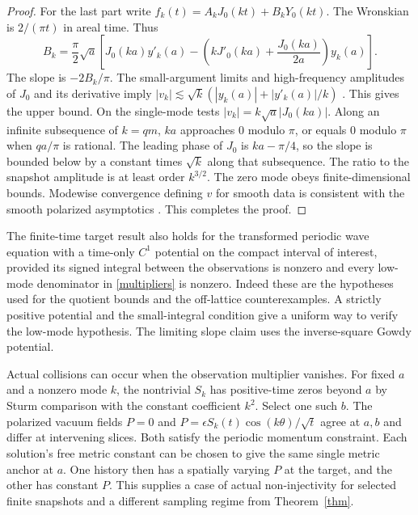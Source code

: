 \documentclass[11pt]{article}
\begin{document}
\begin{proof}
For the last part write
$f_k(t)=A_kJ_0(kt)+B_kY_0(kt)$.
The Wronskian is $2/(\pi t)$ in areal time. Thus
\[
 B_k=\frac{\pi}{2}\sqrt a\left[
 J_0(ka)y'_k(a)
 -\left(kJ'_0(ka)+\frac{J_0(ka)}{2a}\right)y_k(a)\right].
\]
The slope is $-2B_k/\pi$. The small-argument limits and high-frequency
amplitudes of $J_0$ and its derivative imply
$|v_k|\lesssim \sqrt k (|y_k(a)|+|y'_k(a)|/k)$
\cite[Sections 10.5, 10.7 and 10.17]{dlmf}. This gives the upper
bound. On the single-mode tests $|v_k|=k\sqrt a |J_0(ka)|$.
Along an infinite subsequence of $k=qm$, $ka$ approaches $0$ modulo
$\pi$, or equals $0$ modulo $\pi$ when $qa/\pi$ is rational.
The leading phase of $J_0$ is $ka-\pi/4$, so the slope is bounded
below by a constant times $\sqrt k$ along that subsequence.
The ratio to the snapshot amplitude is at least order $k^{3/2}$.
The zero mode obeys finite-dimensional bounds. Modewise convergence
defining $v$ for smooth data is consistent with the smooth polarized
asymptotics \cite{cim}. This completes the proof.
\end{proof}

The finite-time target result also holds for the transformed periodic
wave equation with a time-only $C^1$ potential on the compact interval
of interest, provided its signed integral between the observations
is nonzero and every low-mode denominator in \eqref{multipliers}
is nonzero. Indeed these are the hypotheses used for the quotient
bounds and the off-lattice counterexamples. A strictly positive
potential and the small-integral condition give a uniform way to
verify the low-mode hypothesis. The limiting slope claim uses the
inverse-square Gowdy potential.

Actual collisions can occur when the observation multiplier vanishes. For fixed $a$ and a nonzero mode $k$, the
nontrivial $S_k$ has positive-time zeros beyond $a$ by Sturm comparison
with the constant coefficient $k^2$. Select one such $b$.
The polarized vacuum fields $P=0$ and
$P=\epsilon S_k(t)\cos(k\theta)/\sqrt t$ agree at $a,b$
and differ at intervening slices. Both satisfy the periodic
momentum constraint. Each solution's free metric constant
can be chosen to give the same single metric anchor at $a$.
One history then has a spatially varying $P$ at the target,
and the other has constant $P$. This supplies a case of actual
non-injectivity for selected finite snapshots and a different sampling
regime from Theorem~\ref{thm}.
\end{document}
